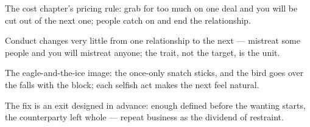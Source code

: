 

\begin{distilled}
  \item The cost chapter's pricing rule: grab for too much on one deal and you will be cut out of the next one; people catch on and end the relationship.
  \item Conduct changes very little from one relationship to the next --- mistreat some people and you will mistreat anyone; the trait, not the target, is the unit.
  \item The eagle-and-the-ice image: the once-only snatch sticks, and the bird goes over the falls with the block; each selfish act makes the next feel natural.
  \item The fix is an exit designed in advance: enough defined before the wanting starts, the counterparty left whole --- repeat business as the dividend of restraint.
\end{distilled}
